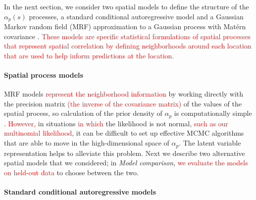 \documentclass[10pt,letterpaper]{article}
\newcommand{\matern}{Mat\'{e}rn }
\begin{document}
In the next section, we consider two spatial models to define the
structure of the $\alpha_{p}(s)$ processes, a standard conditional
autoregressive model \cite{Bane:etal:2004} and a Gaussian Markov
random field (MRF) approximation to a Gaussian process with \matern
covariance \cite{Lind:etal:2011}. \textcolor{red}{These models are
specific statistical formulations of spatial processes that represent
spatial correlation by defining neighborhoods around each location
that are used to help inform predictions at the location. }


\paragraph*{Spatial process models}

MRF models \textcolor{red}{represent the neighborhood information
}by working directly with the precision matrix \textcolor{red}{(the
inverse of the covariance matrix)} of the values of the spatial process,
so calculation of the prior density of $\alpha_{p}$ is computationally
simple \cite{Rue:Held:2005}. \textcolor{red}{However,} in situations
\textcolor{red}{in which} the likelihood is not normal, \textcolor{red}{such
as our multinomial likelihood}, it can be difficult to set up effective
MCMC algorithms that are able to move in the high-dimensional space
of $\alpha_{p}$. The latent variable representation
helps to alleviate this problem. Next we describe two alternative
spatial models that we considered; in \emph{Model comparison},
\textcolor{red}{we evaluate the models on held-out data} to choose
between the two.

\paragraph{Standard conditional autoregressive models}
\end{document}
